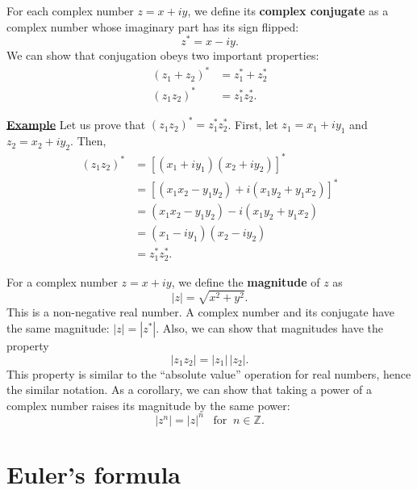 \documentclass[10pt,a4paper]{article}
\begin{document}
For each complex number $z = x + iy$, we define its \textbf{complex
  conjugate} as a complex number whose imaginary part has its sign
flipped:
\begin{equation}
  z^* = x - i y.
\end{equation}
We can show that conjugation obeys two important properties:
\begin{align}
  (z_1 + z_2)^* &= z_1^* + z_2^* \\
  (z_1 z_2)^* &= z_1^* z_2^*.
\end{align}

\begin{framed}
\noindent
\underline{\textbf{Example}}
\vskip 0.1in \noindent
Let us prove that $(z_1 z_2)^* = z_1^* z_2^*$. First, let
$z_1 = x_1 + i y_1$ and $z_2 = x_2 + i y_2$.
Then,
\begin{align*}
  (z_1 z_2)^* &= \left[(x_1+iy_1)(x_2+iy_2)\right]^* \\
  &= \left[\left(x_1 x_2 - y_1 y_2\right) + i\left(x_1y_2+y_1x_2\right)\right]^* \\
  &= \left(x_1 x_2 - y_1 y_2\right) - i\left(x_1y_2+y_1x_2\right) \\
  &= \left(x_1 - i y_1\right)\left(x_2 - i y_2\right) \\
  &= z_1^* z_2^*.
\end{align*}
\end{framed}

For a complex number $z = x + i y$, we define the \textbf{magnitude}
of $z$ as
\begin{equation}
  |z| = \sqrt{x^2 + y^2}.
\end{equation}
This is a non-negative real number.  A complex number and its
conjugate have the same magnitude: $|z| = |z^*|$.  Also, we can show
that magnitudes have the property
\begin{equation}
  |z_1 z_2| = |z_1| \, |z_2|.
\end{equation}
This property is similar to the ``absolute value'' operation for real
numbers, hence the similar notation.  As a corollary, we can show that
taking a power of a complex number raises its magnitude by the same
power:
\begin{equation}
  |z^n| = |z|^n \;\;\;\textrm{for}\;\;n \in \mathbb{Z}.
\end{equation}

\section{Euler's formula}\label{eulers-formula}
\end{document}
